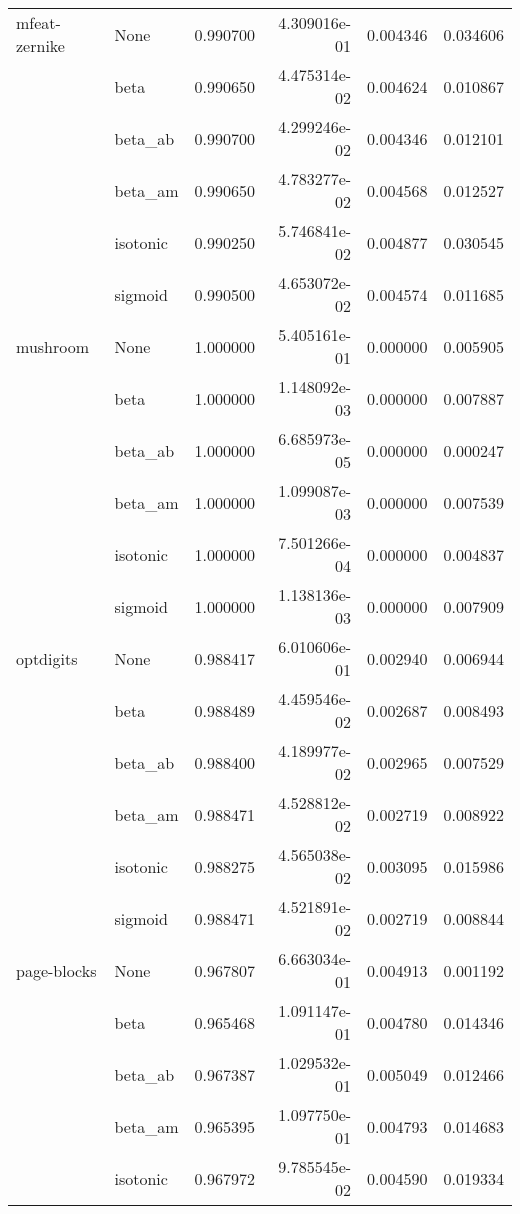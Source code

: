 \begin{tabular}{llrrrr}
mfeat-zernike & None &  0.990700 &  4.309016e-01 &  0.004346 &  0.034606 \\
        & beta &  0.990650 &  4.475314e-02 &  0.004624 &  0.010867 \\
        & beta\_ab &  0.990700 &  4.299246e-02 &  0.004346 &  0.012101 \\
        & beta\_am &  0.990650 &  4.783277e-02 &  0.004568 &  0.012527 \\
        & isotonic &  0.990250 &  5.746841e-02 &  0.004877 &  0.030545 \\
        & sigmoid &  0.990500 &  4.653072e-02 &  0.004574 &  0.011685 \\
mushroom & None &  1.000000 &  5.405161e-01 &  0.000000 &  0.005905 \\
        & beta &  1.000000 &  1.148092e-03 &  0.000000 &  0.007887 \\
        & beta\_ab &  1.000000 &  6.685973e-05 &  0.000000 &  0.000247 \\
        & beta\_am &  1.000000 &  1.099087e-03 &  0.000000 &  0.007539 \\
        & isotonic &  1.000000 &  7.501266e-04 &  0.000000 &  0.004837 \\
        & sigmoid &  1.000000 &  1.138136e-03 &  0.000000 &  0.007909 \\
optdigits & None &  0.988417 &  6.010606e-01 &  0.002940 &  0.006944 \\
        & beta &  0.988489 &  4.459546e-02 &  0.002687 &  0.008493 \\
        & beta\_ab &  0.988400 &  4.189977e-02 &  0.002965 &  0.007529 \\
        & beta\_am &  0.988471 &  4.528812e-02 &  0.002719 &  0.008922 \\
        & isotonic &  0.988275 &  4.565038e-02 &  0.003095 &  0.015986 \\
        & sigmoid &  0.988471 &  4.521891e-02 &  0.002719 &  0.008844 \\
page-blocks & None &  0.967807 &  6.663034e-01 &  0.004913 &  0.001192 \\
        & beta &  0.965468 &  1.091147e-01 &  0.004780 &  0.014346 \\
        & beta\_ab &  0.967387 &  1.029532e-01 &  0.005049 &  0.012466 \\
        & beta\_am &  0.965395 &  1.097750e-01 &  0.004793 &  0.014683 \\
        & isotonic &  0.967972 &  9.785545e-02 &  0.004590 &  0.019334 \\

\end{tabular}
